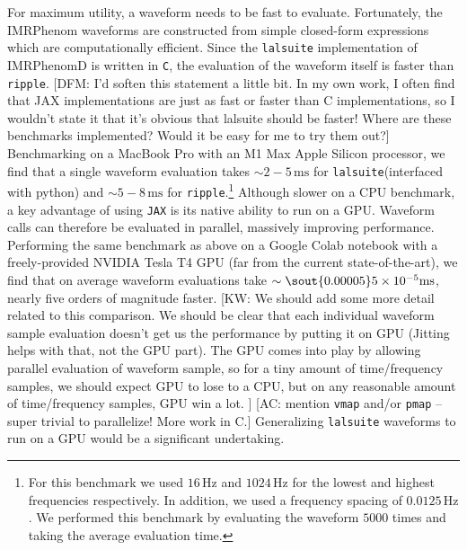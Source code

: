 \documentclass[twocolumn]{aastex631}
\newcommand{\jax}{\texttt{JAX}\xspace}
\newcommand{\ripple}{\texttt{ripple}\xspace}
\newcommand{\lalsuite}{\texttt{lalsuite}\xspace}
\newcommand{\kw}[1]{{\color{rb4}[KW: #1 ]}}
\newcommand{\dfm}[1]{{\color{dfm}[DFM: #1]}}
\newcommand{\amc}[1]{{\color{red}[AC: #1]}}
\begin{document}
For maximum utility, a waveform needs to be fast to evaluate.
Fortunately, the IMRPhenom waveforms are constructed from simple closed-form expressions which are computationally efficient.
Since the \lalsuite implementation of IMRPhenomD is written in \texttt{C}, the evaluation of the waveform itself is faster than \ripple. \dfm{I'd soften this statement a little bit. In my own work, I often find that JAX implementations are just as fast or faster than C implementations, so I wouldn't state it that it's obvious that lalsuite should be faster! Where are these benchmarks implemented? Would it be easy for me to try them out?}
Benchmarking on a MacBook Pro with an M1 Max Apple Silicon processor, we find that a single waveform evaluation takes $\sim 2-5\,\mathrm{ms}$ for \lalsuite (interfaced with python) and $\sim 5-8\,\mathrm{ms}$ for \ripple.\footnote{
    For this benchmark we used $16\,\mathrm{Hz}$ and $1024\,\mathrm{Hz}$ for the lowest and highest frequencies respectively. 
    In addition, we used a frequency spacing of $0.0125\,\mathrm{Hz}$. 
    We performed this benchmark by evaluating the waveform $5000$ times and taking the average evaluation time.
}
Although slower on a CPU benchmark, a key advantage of using \jax is its native ability to run on a GPU.
Waveform calls can therefore be evaluated in parallel, massively improving performance.
Performing the same benchmark as above on a Google Colab notebook with a freely-provided NVIDIA Tesla T4 GPU (far from the current state-of-the-art), we find that on average waveform evaluations take $\sim \sout{0.00005} 5 \times 10^{-5}\mathrm{ms}$, nearly five orders of magnitude faster.
\kw{We should add some more detail related to this comparison. We should be clear that each individual waveform sample evaluation doesn't get us the performance by putting it on GPU (Jitting helps with that, not the GPU part). The GPU comes into play by allowing parallel evaluation of waveform sample, so for a tiny amount of time/frequency samples, we should expect GPU to lose to a CPU, but on any reasonable amount of time/frequency samples, GPU win a lot.}
\amc{mention \texttt{vmap} and/or \texttt{pmap} -- super trivial to parallelize! More work in C.}
Generalizing \lalsuite waveforms to run on a GPU would be a significant undertaking.
\end{document}
